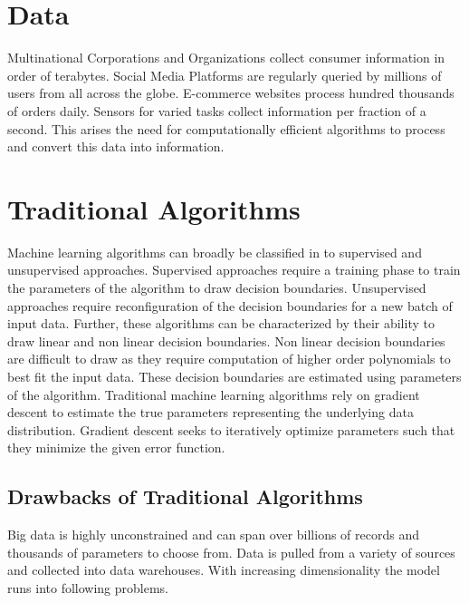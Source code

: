 \documentclass[sigconf]{acmart}
\begin{document}
\section{Data} \label{data}

Multinational Corporations and Organizations collect consumer information in order of terabytes. Social Media Platforms are regularly queried by millions of users from all across the globe. E-commerce websites process hundred thousands of orders daily. Sensors for varied tasks collect information per fraction of a second. This arises the need for computationally efficient algorithms to process and convert this data into information.

\section{Traditional Algorithms} \label{traditional}

Machine learning algorithms can broadly be classified in to supervised \cite{Kotsiantis} and unsupervised approaches. Supervised approaches require a training phase to train the parameters of the algorithm to draw decision boundaries. Unsupervised approaches require reconfiguration of the decision boundaries for a new batch of input data. Further, these algorithms can be characterized by their ability to draw linear and non linear decision boundaries. Non linear decision boundaries are difficult to draw as they require computation of higher order polynomials to best fit the input data. These decision boundaries are estimated using parameters of the algorithm. Traditional machine learning algorithms rely on gradient descent to estimate the true parameters representing the underlying data distribution\cite{Bottou2010}. Gradient descent seeks to iteratively optimize parameters such that they minimize the given error function.


\subsection{Drawbacks of Traditional Algorithms}

Big data is highly unconstrained and can span over billions of records and thousands of parameters to choose from. Data is pulled from a variety of sources and collected into data warehouses. With increasing dimensionality the model runs into following problems.
\end{document}
